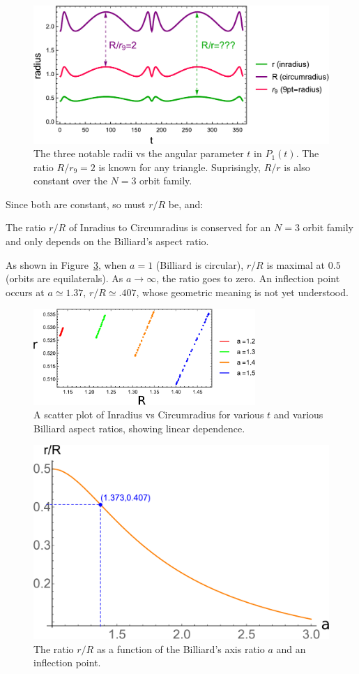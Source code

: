 \begin{figure}[H]
    \centering
     \includegraphics[width=.75\textwidth]{pics/0075_radii_plot.pdf}
    \caption{The three notable radii vs the angular parameter $t$ in $P_1(t)$. The ratio $R/r_9=2$ is known for any triangle. Suprisingly, $R/r$ is also constant over the $N=3$ orbit family.}
    \label{fig:radii_plot}
\end{figure}

\noindent Since both are constant, so must $r/R$ be, and:

\begin{theorem}
The ratio $r/R$ of Inradius to Circumradius is conserved for an $N=3$ orbit family and only depends on the Billiard's aspect ratio.
\label{obs:rovR}
\end{theorem}

As shown in Figure~\ref{fig:ratio_vs_a}, when $a=1$ (Billiard is circular), $r/R$ is maximal at $0.5$ (orbits are equilaterals). As $a\rightarrow\infty$, the ratio goes to zero. An inflection point occurs at $a\simeq{1.37}$, $r/R\simeq{.407}$, whose geometric meaning is not yet understood.

\begin{figure}[H]
    \centering
    \includegraphics[width=0.75\textwidth]{pics/0080_radii_scatter.pdf}
    \caption{A scatter plot of Inradius vs Circumradius for various $t$ and various Billiard aspect ratios, showing linear dependence.}
    \label{fig:radii_scatter}
\end{figure}

\begin{figure}[H]
    \centering
    \includegraphics[width=.55\textwidth]{pics/0085_r_ov_R.pdf}
    \caption{The ratio $r/R$ as a function of the Billiard's axis ratio $a$ and an inflection point.}
    \label{fig:ratio_vs_a}
\end{figure}


